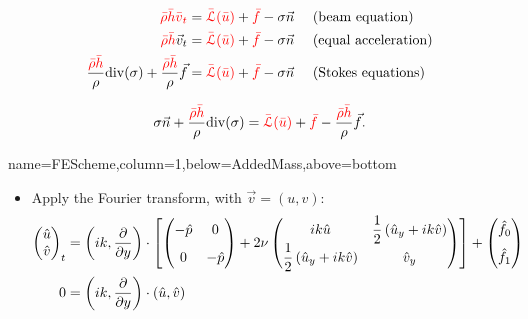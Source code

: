 \documentclass[
paperwidth=48in,paperheight=36in,
fontscale=0.4
]{baposter}
\begin{document}
\begin{poster}
{\begin{align*}
    {\color{red} \bar{\rho}} {\color{red} \bar{h}} {\color{red} \bar{v}}_{{\color{red}t}}
    &= {\color{red} \bar{\mathcal{L}}(\bar{u})} + {\color{red} \bar{f}} - \sigma \vec{n}
    \quad \text{ (beam equation)}                                             \\
    {\color{red} \bar{\rho}} {\color{red} \bar{h}} \vec{v}_t
    &= {\color{red} \bar{\mathcal{L}}(\bar{u})} + {\color{red} \bar{f}} - \sigma \vec{n}
    \quad \text{ (equal acceleration)}                                        \\
    \dfrac{{\color{red} \bar{\rho}} {\color{red} \bar{h}}}{\rho} \mathrm{div}(\sigma)
    + \dfrac{{\color{red} \bar{\rho}} {\color{red} \bar{h}}}{\rho} \vec{f}
    &= {\color{red} \bar{\mathcal{L}}(\bar{u})} + {\color{red} \bar{f}} - \sigma \vec{n}
    \quad \text{ (Stokes equations)}
\end{align*}

\begin{equation*}
    \sigma \vec{n} + \dfrac{{\color{red} \bar{\rho}} {\color{red} \bar{h}}}{\rho} \mathrm{div}(\sigma)
    = {\color{red} \bar{\mathcal{L}}(\bar{u})}
    + {\color{red} \bar{f}}
    - \dfrac{{\color{red} \bar{\rho}} {\color{red} \bar{h}}}{\rho} \vec{f}.
\end{equation*}

\phantom{A}
}

{name=FEScheme,column=1,below=AddedMass,above=bottom}
{
\begin{itemize}
    \item Apply the Fourier transform, with \(\vec{v} = (u, v)\):
          \begin{align*}
              \begin{pmatrix}
                  \hat{u} \\ \hat{v}
              \end{pmatrix}_t
              &=
              \left(
                  i k, \dfrac{\partial}{\partial y}
              \right)
              \cdot
              \left[
              \begin{pmatrix}
                  -\hat{p} \vphantom{\dfrac{1}{2}} & 0                        \\
                  0 \vphantom{\dfrac{1}{2}}        & -\hat{p}
              \end{pmatrix}
              +
              2 \nu
              \begin{pmatrix}
                  i k \hat{u} & \dfrac{1}{2} \left(\hat{u}_y + i k \hat{v}\right)\\
                  \dfrac{1}{2} \left(\hat{u}_y + i k \hat{v}\right) & \hat{v}_y
              \end{pmatrix}
              \right]
              +
              \begin{pmatrix}
                  \hat{f}_0 \vphantom{\dfrac{1}{2}}                           \\
                  \hat{f}_1 \vphantom{\dfrac{1}{2}}
              \end{pmatrix}                                                   \\
              0 &=
              \left(i k, \dfrac{\partial}{\partial y}\right) \cdot (\hat{u},
              \hat{v})
          \end{align*}


\end{itemize}}
\end{poster}
\end{document}
